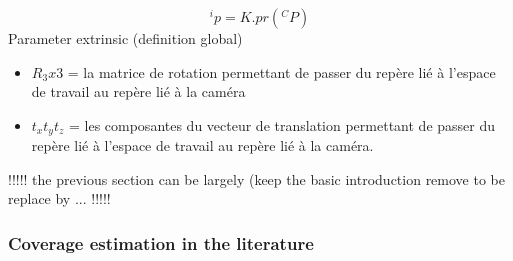 $$
^ip=K.pr(^CP)
$$ 	  
 Parameter extrinsic (definition global) \\
  \begin{itemize}
 	\item$R_3x3$ = la matrice de rotation permettant de passer du repère lié à l'espace de travail au repère lié à la caméra\\
 	\item$t_x t_y t_z$ = les composantes du vecteur de translation permettant de passer du repère lié à l'espace de travail au repère lié à la caméra.\\
  \end{itemize}
 
!!!!! the previous section can be largely (keep the basic introduction remove to be replace by ... !!!!!
\fi
\subsubsection{Coverage estimation in the literature}

